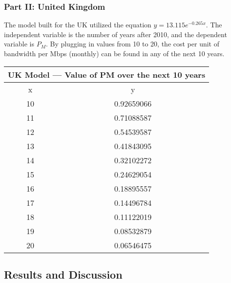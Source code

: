     \subsubsection*{Part II: United Kingdom}
    The model built for the UK utilized the equation $y = 13.115e^{-0.265x}$. The independent variable is the number of years after 2010, and the dependent variable is $P_M$. By plugging in values from 10 to 20, the cost per unit of bandwidth per Mbps (monthly) can be found in any of the next 10 years.
    
    \begin{center}
\begin{tabular}{|c|c|}
\hline
\multicolumn{2}{|c|}{UK Model — Value of PM over the next 10 years} \\ \hline
x                            & y                                    \\ \hline
10                           & 0.92659066                           \\ \hline
11                           & 0.71088587                           \\ \hline
12                           & 0.54539587                           \\ \hline
13                           & 0.41843095                           \\ \hline
14                           & 0.32102272                           \\ \hline
15                           & 0.24629054                           \\ \hline
16                           & 0.18895557                           \\ \hline
17                           & 0.14496784                           \\ \hline
18                           & 0.11122019                           \\ \hline
19                           & 0.08532879                           \\ \hline
20                           & 0.06546475                           \\ \hline
\end{tabular}
    \end{center}
    
    

    \subsection*{Results and Discussion}
